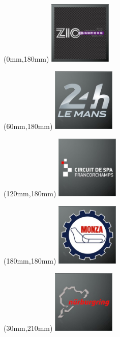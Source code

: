 \begin{textblock*}{30mm}(0mm,180mm)%
\includegraphics[width=30mm]{LG/2015-05-20_00099.png}
\end{textblock*}
\begin{textblock*}{30mm}(60mm,180mm)%
\includegraphics[width=30mm]{LG/2015-05-20_00084.png}
\end{textblock*}
\begin{textblock*}{30mm}(120mm,180mm)%
\includegraphics[width=30mm]{LG/2015-05-20_00079.png}
\end{textblock*}
\begin{textblock*}{30mm}(180mm,180mm)%
\includegraphics[width=30mm]{LG/2015-05-20_00086.png}
\end{textblock*}
\begin{textblock*}{30mm}(30mm,210mm)%
\includegraphics[width=30mm]{LG/2015-05-20_00088.png}
\end{textblock*}
